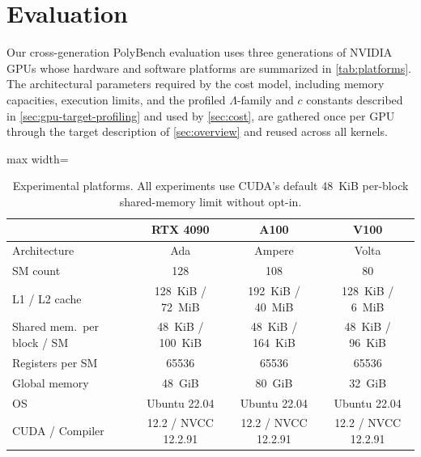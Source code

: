 \section{Evaluation}
\label{sec:eval}

Our cross-generation PolyBench evaluation uses three generations of NVIDIA GPUs whose hardware and software platforms are summarized in \autoref{tab:platforms}. The architectural parameters required by the cost model, including memory capacities, execution limits, and the profiled \(\Lambda\)-family and \(c\) constants described in \autoref{sec:gpu-target-profiling} and used by \autoref{sec:cost}, are gathered once per GPU through the target description of \autoref{sec:overview} and reused across all kernels.

\begin{table}[tbp]
  \centering
  \caption{Experimental platforms. All experiments use CUDA's default \SI{48}{KiB} per-block shared-memory limit without opt-in.}
  \label{tab:platforms}
  \scriptsize
  \begin{adjustbox}{max width=\linewidth}
  \begin{tabular}{lccc}
    \toprule
     & RTX 4090 & A100 & V100 \\
    \midrule
    Architecture & Ada & Ampere & Volta \\
    SM count & 128 & 108 & 80 \\
    L1 / L2 cache & \SI{128}{KiB} / \SI{72}{MiB} & \SI{192}{KiB} / \SI{40}{MiB} & \SI{128}{KiB} / \SI{6}{MiB} \\
    Shared mem.\ per block / SM & \SI{48}{KiB} / \SI{100}{KiB} & \SI{48}{KiB} / \SI{164}{KiB} & \SI{48}{KiB} / \SI{96}{KiB} \\
    Registers per SM & 65536 & 65536 & 65536 \\
    Global memory & \SI{48}{GiB} & \SI{80}{GiB} & \SI{32}{GiB} \\
    OS & Ubuntu 22.04 & Ubuntu 22.04 & Ubuntu 22.04 \\
    CUDA / Compiler & 12.2 / NVCC 12.2.91 & 12.2 / NVCC 12.2.91 & 12.2 / NVCC 12.2.91 \\
    \bottomrule
  \end{tabular}
  \end{adjustbox}
\end{table}

